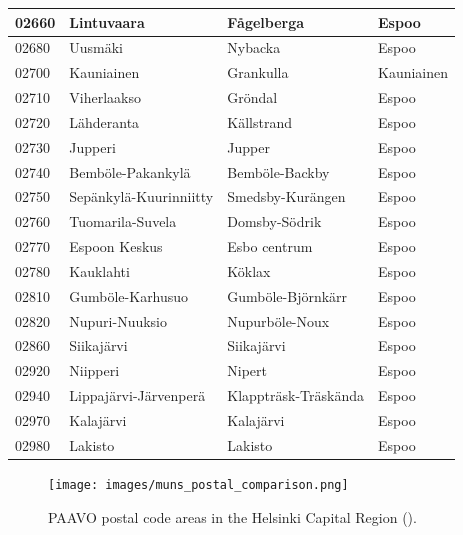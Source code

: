 \begin{longtable}{llll}
    02660 & Lintuvaara & Fågelberga & Espoo \\ [0.25ex] \hline
    02680 & Uusmäki & Nybacka & Espoo \\ [0.25ex] \hline
    02700 & Kauniainen & Grankulla & Kauniainen \\ [0.25ex] \hline
    02710 & Viherlaakso & Gröndal & Espoo \\ [0.25ex] \hline
    02720 & Lähderanta & Källstrand & Espoo \\ [0.25ex] \hline
    02730 & Jupperi & Jupper & Espoo \\ [0.25ex] \hline
    02740 & Bemböle-Pakankylä & Bemböle-Backby & Espoo \\ [0.25ex] \hline
    02750 & Sepänkylä-Kuurinniitty & Smedsby-Kurängen & Espoo \\ [0.25ex] \hline
    02760 & Tuomarila-Suvela & Domsby-Södrik & Espoo \\ [0.25ex] \hline
    02770 & Espoon Keskus & Esbo centrum & Espoo \\ [0.25ex] \hline
    02780 & Kauklahti & Köklax & Espoo \\ [0.25ex] \hline
    02810 & Gumböle-Karhusuo & Gumböle-Björnkärr & Espoo \\ [0.25ex] \hline
    02820 & Nupuri-Nuuksio & Nupurböle-Noux & Espoo \\ [0.25ex] \hline
    02860 & Siikajärvi & Siikajärvi & Espoo \\ [0.25ex] \hline
    02920 & Niipperi & Nipert & Espoo \\ [0.25ex] \hline
    02940 & Lippajärvi-Järvenperä & Klappträsk-Träskända & Espoo \\ [0.25ex] \hline
    02970 & Kalajärvi & Kalajärvi & Espoo \\ [0.25ex] \hline
    02980 & Lakisto & Lakisto & Espoo \\ [0.75ex] \hline
\end{longtable}

\invisiblesection{}
\begin{figure}
    \texttt{[image: images/muns\_postal\_comparison.png]}
    \caption[PAAVO postal code areas in the Helsinki Capital Region]{PAAVO postal code areas in the Helsinki Capital Region (\cite{OpenStreetMap}).}
    \label{fig:appendix_muns_postal}
\end{figure}
\restoregeometry

